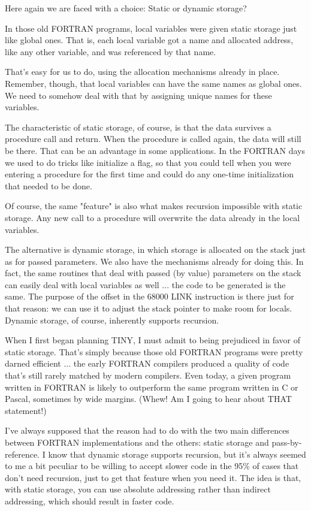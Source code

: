 \documentclass[float=false, crop=false]{standalone}
\begin{document}
Here again we are faced with a choice: Static or dynamic storage?

In those old FORTRAN programs, local variables were given static storage just
like global ones. That is, each local variable got a name and allocated address,
like any other variable, and was referenced by that name.

That's easy for us to do, using the allocation mechanisms already in place.
Remember, though, that local variables can have the same names as global ones.
We need to somehow deal with that by assigning unique names for these variables.

The characteristic of static storage, of course, is that the data survives a
procedure call and return. When the procedure is called again, the data will
still be there. That can be an advantage in some applications. In the FORTRAN
days we used to do tricks like initialize a flag, so that you could tell when
you were entering a procedure for the first time and could do any one-time
initialization that needed to be done.

Of course, the same "feature" is also what makes recursion impossible with
static storage. Any new call to a procedure will overwrite the data already in
the local variables.

The alternative is dynamic storage, in which storage is allocated on the stack
just as for passed parameters. We also have the mechanisms already for doing
this. In fact, the same routines that deal with passed (by value) parameters on
the stack can easily deal with local variables as well ... the code to be
generated is the same. The purpose of the offset in the 68000 LINK instruction
is there just for that reason: we can use it to adjust the stack pointer to make
room for locals. Dynamic storage, of course, inherently supports recursion.

When I first began planning TINY, I must admit to being prejudiced in favor of
static storage. That's simply because those old FORTRAN programs were pretty
darned efficient ... the early FORTRAN compilers produced a quality of code
that's still rarely matched by modern compilers. Even today, a given program
written in FORTRAN is likely to outperform the same program written in C or
Pascal, sometimes by wide margins. (Whew! Am I going to hear about THAT
statement!)

I've always supposed that the reason had to do with the two main differences
between FORTRAN implementations and the others: static storage and
pass-by-reference. I know that dynamic storage supports recursion, but it's
always seemed to me a bit peculiar to be willing to accept slower code in the
95\% of cases that don't need recursion, just to get that feature when you need
it. The idea is that, with static storage, you can use absolute addressing
rather than indirect addressing, which should result in faster code.
\end{document}
